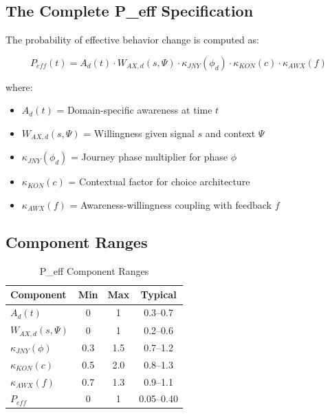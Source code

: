 \subsection{The Complete P\_eff Specification}

The probability of effective behavior change is computed as:

\begin{equation}
\boxed{
P_{eff}(t) = A_d(t) \cdot W_{AX,d}(s, \Psi) \cdot \kappa_{JNY}(\phi_d) \cdot \kappa_{KON}(c) \cdot \kappa_{AWX}(f)
}
\label{eq:peff-complete}
\end{equation}

where:
\begin{itemize}
\item $A_d(t)$ = Domain-specific awareness at time $t$
\item $W_{AX,d}(s, \Psi)$ = Willingness given signal $s$ and context $\Psi$
\item $\kappa_{JNY}(\phi_d)$ = Journey phase multiplier for phase $\phi$
\item $\kappa_{KON}(c)$ = Contextual factor for choice architecture
\item $\kappa_{AWX}(f)$ = Awareness-willingness coupling with feedback $f$
\end{itemize}

\subsection{Component Ranges}

\begin{table}[htbp]
\centering
\caption{P\_eff Component Ranges}
\label{tab:peff-ranges}
\renewcommand{\arraystretch}{1.3}
\begin{tabular}{@{}lccc@{}}
\toprule
\textbf{Component} & \textbf{Min} & \textbf{Max} & \textbf{Typical} \\
\midrule
$A_d(t)$ & 0 & 1 & 0.3--0.7 \\
$W_{AX,d}(s, \Psi)$ & 0 & 1 & 0.2--0.6 \\
$\kappa_{JNY}(\phi)$ & 0.3 & 1.5 & 0.7--1.2 \\
$\kappa_{KON}(c)$ & 0.5 & 2.0 & 0.8--1.3 \\
$\kappa_{AWX}(f)$ & 0.7 & 1.3 & 0.9--1.1 \\
\midrule
$P_{eff}$ & 0 & 1 & 0.05--0.40 \\
\bottomrule
\end{tabular}
\end{table}


